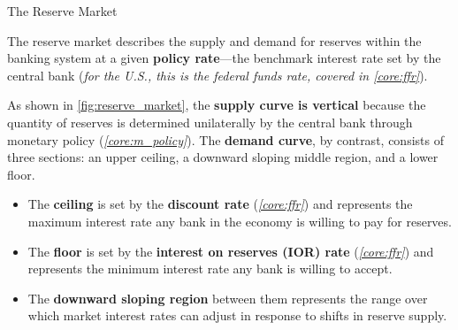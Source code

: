 \documentclass[10pt]{article}
\begin{document}
    \begin{core}{The Reserve Market}

      The reserve market describes the supply and demand for reserves within the banking system at a given \textbf{policy rate}---the benchmark interest rate set by the central bank (\textit{for the U.S., this is the federal funds rate, covered in \textit{\autoref{core:ffr}}}).

      As shown in \autoref{fig:reserve_market}, the \textbf{supply curve is vertical} because the quantity of reserves is determined unilaterally by the central bank through monetary policy (\textit{\autoref{core:m_policy}}). The \textbf{demand curve}, by contrast, consists of three sections: an upper ceiling, a downward sloping middle region, and a lower floor.

      \begin{itemize}

        \item The \textbf{ceiling} is set by the \textbf{discount rate} (\textit{\autoref{core:ffr}}) and represents the maximum interest rate any bank in the economy is willing to pay for reserves.

        \item The \textbf{floor} is set by the \textbf{interest on reserves (IOR) rate} (\textit{\autoref{core:ffr}}) and represents the minimum interest rate any bank is willing to accept.

        \item The \textbf{downward sloping region} between them represents the range over which market interest rates can adjust in response to shifts in reserve supply.

      \end{itemize}

\end{core}
\end{document}
